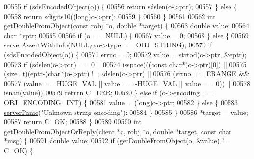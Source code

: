 \begin{DoxyCode}
{00555     \textcolor{keywordflow}{if} (\hyperlink{server_8h_afcfb5bd97af52d1dbce331745cae030c}{sdsEncodedObject}(o)) \{
00556         \textcolor{keywordflow}{return} sdslen(o->ptr);
00557     \} \textcolor{keywordflow}{else} \{
00558         \textcolor{keywordflow}{return} sdigits10((\textcolor{keywordtype}{long})o->ptr);
00559     \}
00560 \}
00561 
00562 \textcolor{keywordtype}{int} getDoubleFromObject(\textcolor{keyword}{const} robj *o, \textcolor{keywordtype}{double} *target) \{
00563     \textcolor{keywordtype}{double} value;
00564     \textcolor{keywordtype}{char} *eptr;
00565 
00566     \textcolor{keywordflow}{if} (o == NULL) \{
00567         value = 0;
00568     \} \textcolor{keywordflow}{else} \{
00569         \hyperlink{server_8h_a7308f76cbff9a8d3797fe78190b91282}{serverAssertWithInfo}(NULL,o,o->type == 
      \hyperlink{server_8h_a65236ea160f69cdef33ec942092af88f}{OBJ\_STRING});
00570         \textcolor{keywordflow}{if} (\hyperlink{server_8h_afcfb5bd97af52d1dbce331745cae030c}{sdsEncodedObject}(o)) \{
00571             errno = 0;
00572             value = strtod(o->ptr, &eptr);
00573             \textcolor{keywordflow}{if} (sdslen(o->ptr) == 0 ||
00574                 isspace(((\textcolor{keyword}{const} \textcolor{keywordtype}{char}*)o->ptr)[0]) ||
00575                 (size\_t)(eptr-(\textcolor{keywordtype}{char}*)o->ptr) != sdslen(o->ptr) ||
00576                 (errno == ERANGE &&
00577                     (value == HUGE\_VAL || value == -HUGE\_VAL || value == 0)) ||
00578                 isnan(value))
00579                 \textcolor{keywordflow}{return} \hyperlink{server_8h_af98ac28d5f4d23d7ed5985188e6fb7d1}{C\_ERR};
00580         \} \textcolor{keywordflow}{else} \textcolor{keywordflow}{if} (o->encoding == \hyperlink{server_8h_ae934cf008a0be0ef009c92c2d006a816}{OBJ\_ENCODING\_INT}) \{
00581             value = (\textcolor{keywordtype}{long})o->ptr;
00582         \} \textcolor{keywordflow}{else} \{
00583             \hyperlink{server_8h_a11cc378e7778a830b41240578de3b204}{serverPanic}(\textcolor{stringliteral}{"Unknown string encoding"});
00584         \}
00585     \}
00586     *target = value;
00587     \textcolor{keywordflow}{return} \hyperlink{server_8h_a303769ef1065076e68731584e758d3e1}{C\_OK};
00588 \}
00589 
00590 \textcolor{keywordtype}{int} getDoubleFromObjectOrReply(\hyperlink{structclient}{client} *c, robj *o, \textcolor{keywordtype}{double} *target, \textcolor{keyword}{const} \textcolor{keywordtype}{char} *msg) \{
00591     \textcolor{keywordtype}{double} value;
00592     \textcolor{keywordflow}{if} (getDoubleFromObject(o, &value) != \hyperlink{server_8h_a303769ef1065076e68731584e758d3e1}{C\_OK}) \{
}
\end{DoxyCode}
